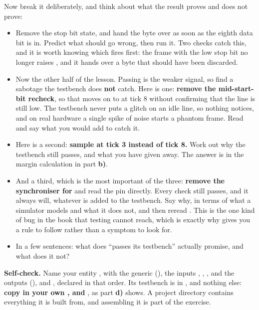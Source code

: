  Now break it deliberately, and think about what the result proves and does not prove:
\begin{itemize}
  \item Remove the stop bit state, and hand the byte over as soon as the eighth data bit is in.
    Predict what should go wrong, then run it. Two checks catch this, and it is worth knowing which
    fires first: the frame with the low stop bit no longer raises , and it hands over
    a byte that should have been discarded.
  \item Now the other half of the lesson. Passing is the weaker signal, so find a sabotage the
    testbench does \textbf{not} catch. Here is one: \textbf{remove the mid-start-bit recheck}, so
    that  moves on to  at tick 8 without confirming that the line
    is still low. The testbench never puts a glitch on an idle line, so nothing notices, and on real
    hardware a single spike of noise starts a phantom frame. Read  and say what
    you would add to catch it.
  \item Here is a second: \textbf{sample at tick 3 instead of tick 8.} Work out why the testbench
    still passes, and what you have given away. The answer is in the margin calculation in part
    \textbf{b)}.
  \item And a third, which is the most important of the three: \textbf{remove the synchroniser for
    } and read the pin directly. Every check still passes, and it always will, whatever is
    added to the testbench. Say why, in terms of what a simulator models and what it does not, and
    then reread . This is the one kind of bug in the book that testing cannot
    reach, which is exactly why  gives you a rule to follow rather than a symptom to
    look for.
  \item In a few sentences: what does ``passes its testbench'' actually promise, and what does it
    not?
\end{itemize}


\begin{selfcheck}
\textbf{Self-check.} Name your entity , with the generic
 (), the inputs , , ,
and the outputs  (),  and
, declared in that order. Its testbench is in , and nothing
else: \textbf{copy in your own ,  and }, as part \textbf{d)}
shows. A project directory contains everything it is built from, and assembling it is part of the
exercise.
\end{selfcheck}


